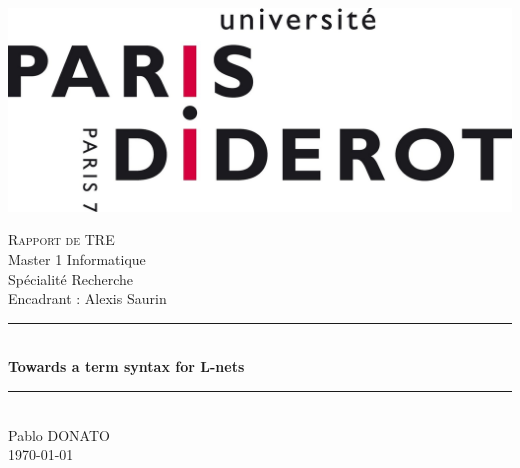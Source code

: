 \documentclass[12pt]{report}
\begin{document}
\begin{center}
    \newcommand{\HRule}{\rule{\linewidth}{0.5mm}}

    \includegraphics[scale=0.1]{img/logo-paris7.jpg}
    \vspace{1.5cm}

    \textsc{\LARGE Rapport de TRE}\\[0.5cm]
    {Master 1 Informatique}\\
    {Spécialité Recherche}\\[0.5cm]
    {Encadrant : Alexis Saurin}\\[1cm]

    \HRule \\[1.0cm]
    {\huge\bf Towards a term syntax for L-nets}\\[0.5cm]
    \HRule \\[1.8cm]

    {\Large Pablo DONATO}\\[2.5cm]

    {\large \today}
\end{center}

\clearpage
{}
\thispagestyle{empty}
\null
\newpage
\end{document}
